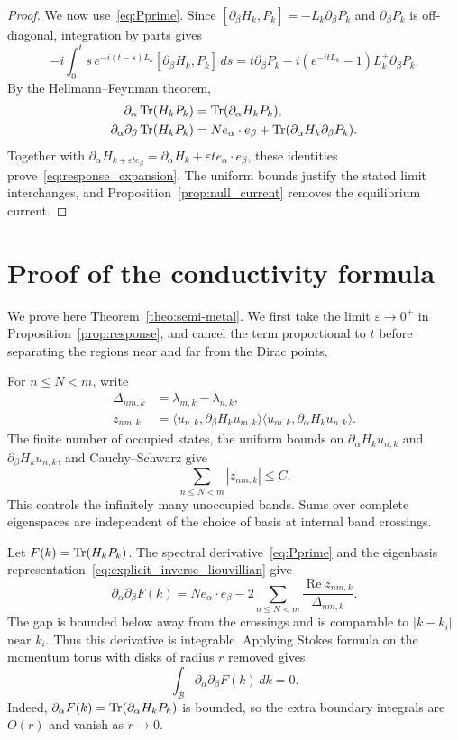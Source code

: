 \documentclass[a4paper,11pt]{article}
\theoremstyle{plain}
\theoremstyle{remark}
\def\eps{{\varepsilon}}
\begin{document}
\begin{proof}
We now use~\eqref{eq:Pprime}. Since
$[\partial_\beta H_k,P_k]=-L_k\partial_\beta P_k$ and
$\partial_\beta P_k$ is off-diagonal, integration by parts gives
\[
-i\int_0^t s\,e^{-i(t-s)L_k}[\partial_\beta H_k,P_k]\,ds
=t\partial_\beta P_k-i(e^{-itL_k}-1)L_k^+\partial_\beta P_k.
\]
By the Hellmann--Feynman theorem,
\begin{align*}
\partial_\alpha\Tr(H_kP_k)&=\Tr(\partial_\alpha H_kP_k),\\
\partial_\alpha\partial_\beta\Tr(H_kP_k)
&=N e_\alpha\cdot e_\beta
+\Tr(\partial_\alpha H_k\partial_\beta P_k).
\end{align*}
Together with
$\partial_\alpha H_{k+\eps te_\beta}
=\partial_\alpha H_k+\eps t e_\alpha\cdot e_\beta$,
these identities prove~\eqref{eq:response_expansion}.
The uniform bounds justify the stated limit interchanges, and
Proposition~\ref{prop:null_current} removes the equilibrium current.
\end{proof}


\section{Proof of the conductivity formula}\label{sec:semimet}

We prove here Theorem~\ref{theo:semi-metal}. We first take the limit
$\eps\to0^+$ in Proposition~\ref{prop:response}, and cancel the term
proportional to $t$ before separating the regions near and far from the
Dirac points.

For $n\le N<m$, write
\begin{align}\label{eq:transition_data}
\Delta_{nm,k}&=\lambda_{m,k}-\lambda_{n,k},\nonumber\\
z_{nm,k}&=\langle u_{n,k},\partial_\beta H_ku_{m,k}\rangle
\langle u_{m,k},\partial_\alpha H_ku_{n,k}\rangle.
\end{align}
The finite number of occupied states, the uniform bounds on
$\partial_\alpha H_ku_{n,k}$ and $\partial_\beta H_ku_{n,k}$,
and Cauchy--Schwarz give
\begin{equation}\label{eq:transition_bound}
\sum_{n\le N<m}|z_{nm,k}|\le C.
\end{equation}
This controls the infinitely many unoccupied bands. Sums over complete
eigenspaces are independent of the choice of basis at internal band crossings.

Let $F(k)=\Tr(H_kP_k)$. The spectral derivative~\eqref{eq:Pprime}
and the eigenbasis representation~\eqref{eq:explicit_inverse_liouvillian}
give
\[
\partial_\alpha\partial_\beta F(k)
=N e_\alpha\cdot e_\beta
-2\sum_{n\le N<m}\frac{\operatorname{Re}z_{nm,k}}{\Delta_{nm,k}}.
\]
The gap is bounded below away from the crossings and is comparable
to $|k-k_i|$ near $k_i$. Thus this derivative is integrable.
Applying Stokes formula on the momentum torus with disks of radius $r$
removed gives
\begin{equation}\label{eq:filled_band_cancellation}
\int_{\mathcal B}\partial_\alpha\partial_\beta F(k)\,dk=0.
\end{equation}
Indeed, $\partial_\alpha F(k)=\Tr(\partial_\alpha H_kP_k)$ is bounded,
so the extra boundary integrals are $O(r)$ and vanish as $r\to0$.
\end{document}
